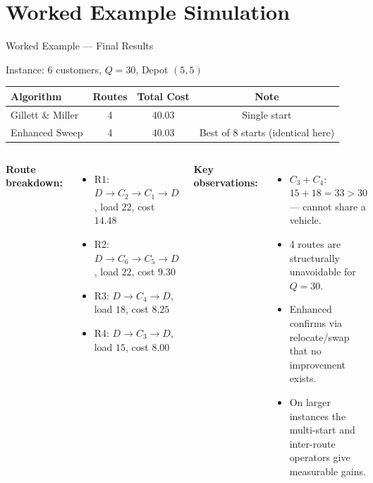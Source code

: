 \documentclass{beamer}
\begin{document}
\section{Worked Example Simulation}

\begin{frame}[shrink=8]{Worked Example --- Final Results}
\begin{block}{Instance: 6 customers, $Q=30$, Depot $(5,5)$}
\centering
\begin{tabular}{lccc}
\toprule
\textbf{Algorithm} & \textbf{Routes} & \textbf{Total Cost} & \textbf{Note} \\
\midrule
Gillett \& Miller & 4 & 40.03 & Single start \\
Enhanced Sweep    & 4 & 40.03 & Best of 8 starts (identical here) \\
\bottomrule
\end{tabular}
\end{block}
\vspace{0.3em}
\begin{columns}[T]
\small\textbf{Route breakdown:}
\begin{itemize}
  \item R1: $D\!\to\!C_2\!\to\!C_1\!\to\!D$, load $22$, cost $14.48$
  \item R2: $D\!\to\!C_6\!\to\!C_5\!\to\!D$, load $22$, cost $9.30$
  \item R3: $D\!\to\!C_4\!\to\!D$, load $18$, cost $8.25$
  \item R4: $D\!\to\!C_3\!\to\!D$, load $15$, cost $8.00$
\end{itemize}
\small\textbf{Key observations:}
\begin{itemize}
  \item $C_3+C_4$: $15+18=33>30$ --- cannot share a vehicle.
  \item 4 routes are structurally unavoidable for $Q=30$.
  \item Enhanced confirms via relocate/swap that no improvement exists.
  \item On larger instances the multi-start and inter-route operators give measurable gains.
\end{itemize}
\end{columns}
\end{frame}
\end{document}
